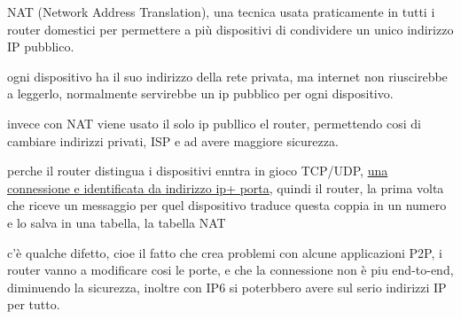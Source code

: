 \documentclass[12pt]{article}
\begin{document}
NAT (Network Address Translation), una tecnica usata praticamente in tutti i router domestici per permettere a più dispositivi di condividere un unico indirizzo IP pubblico.


ogni dispositivo ha il suo indirizzo della rete privata, ma internet non riuscirebbe a leggerlo, normalmente servirebbe un ip pubblico per ogni dispositivo.

invece con NAT viene usato il solo ip publlico el router, permettendo cosi di cambiare indirizzi privati, ISP e ad avere maggiore sicurezza.

perche il router distingua i dispositivi enntra in gioco TCP/UDP, \underline{una connessione e identificata da indirizzo ip+ porta}, quindi il router, la prima volta che riceve un messaggio per quel dispositivo traduce questa coppia in un numero e lo salva in una tabella, la tabella NAT


c'è qualche difetto, cioe il fatto che crea problemi con alcune applicazioni P2P, i router vanno a modificare cosi le porte, e che la connessione non è piu end-to-end, diminuendo la sicurezza, inoltre con IP6 si poterbbero avere sul serio indirizzi IP per tutto.
\end{document}
